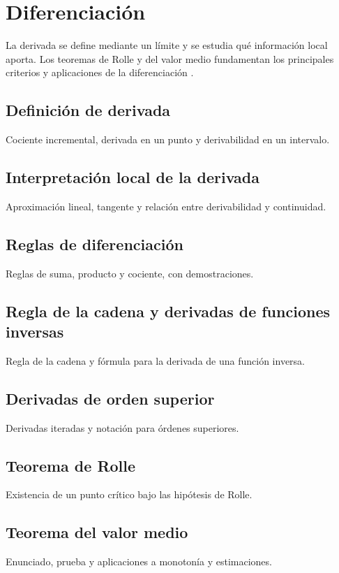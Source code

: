 \chapter{Diferenciación}
\label{cap:diferenciacion}

La derivada se define mediante un límite y se estudia qué información local aporta. Los teoremas de Rolle y del valor medio fundamentan los principales criterios y aplicaciones de la diferenciación \cite{spivak2008,apostol1974,rudin1976}.

\section{Definición de derivada}
Cociente incremental, derivada en un punto y derivabilidad en un intervalo.

\section{Interpretación local de la derivada}
Aproximación lineal, tangente y relación entre derivabilidad y continuidad.

\section{Reglas de diferenciación}
Reglas de suma, producto y cociente, con demostraciones.

\section{Regla de la cadena y derivadas de funciones inversas}
Regla de la cadena y fórmula para la derivada de una función inversa.

\section{Derivadas de orden superior}
Derivadas iteradas y notación para órdenes superiores.

\section{Teorema de Rolle}
Existencia de un punto crítico bajo las hipótesis de Rolle.

\section{Teorema del valor medio}
Enunciado, prueba y aplicaciones a monotonía y estimaciones.

